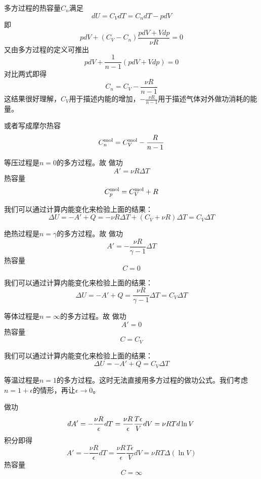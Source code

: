 \documentclass[CJK]{beamer}
\begin{document}
\begin{frame}
\bch
{\small
多方过程的热容量$C_n$满足
$$dU = C_VdT = C_n dT - pdV$$
即
$$pdV + (C_V - C_n) \frac{pdV+Vdp}{\nu R} = 0$$
又由多方过程的定义可推出
$$pdV + \frac{1}{n-1}(pdV + Vdp) = 0$$
对比两式即得
{\blue
$$C_n = C_V - \frac{\nu R}{n-1}$$
}
这结果很好理解，$C_V$用于描述内能的增加，$- \frac{\nu R}{n-1}$用于描述气体对外做功消耗的能量。

或者写成摩尔热容
$$C_n^{\rm mol} = C_V^{\rm mol} - \frac{R}{n-1}$$
}
\ech
\end{frame}


\begin{frame}
\bch
\bex
等压过程是$n=0$的多方过程。故
做功
$$A' = \nu R\Delta T $$
热容量
$$C_p^{\rm mol} = C_V^{\rm mol}+ R $$

\skipline

我们可以通过计算内能变化来检验上面的结果：
$$ \Delta U = -A' + Q = -\nu R\Delta T +(C_V + \nu R)\Delta T =  C_V\Delta T$$

\eex
\ech
\end{frame}

\begin{frame}
\bch
\bex
绝热过程是$n=\gamma$的多方过程。故
做功
$$A' = -\frac{\nu R}{\gamma-1}\Delta T$$
热容量
$$C = 0 $$

我们可以通过计算内能变化来检验上面的结果：
$$ \Delta U = -A' + Q = \frac{\nu R}{\gamma-1} \Delta T  =  C_V\Delta T$$

\eex
\ech
\end{frame}

\begin{frame}
\bch
\bex
等体过程是$n=\infty$的多方过程。故
做功
$$A' = 0$$
热容量
$$C = C_V $$

我们可以通过计算内能变化来检验上面的结果：
$$ \Delta U = -A' + Q =  C_V\Delta T$$

\eex
\ech
\end{frame}


\begin{frame}
\bch
\bex
等温过程是$n=1$的多方过程。这时无法直接用多方过程的做功公式。我们考虑$n=1+\epsilon$的情形，再让$\epsilon \rightarrow 0$。

做功
$$\dbar A' = -\frac{\nu R}{\epsilon}dT = \frac{\nu R}{\epsilon}\frac{T\epsilon}{V}dV = \nu RT d\ln V $$
积分即得
$$ A' = -\frac{\nu R}{\epsilon}dT = \frac{\nu R}{\epsilon}\frac{T\epsilon}{V}dV = \nu RT \Delta(\ln V) $$
热容量
$$C = \infty $$

\eex
\ech
\end{frame}
\end{document}
